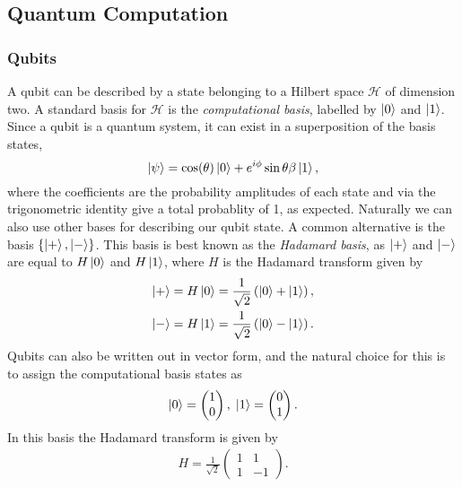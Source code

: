 \subsection{Quantum Computation}
\subsubsection{Qubits}
\label{subsubsection:qubits}
A qubit can be described by a state belonging to a Hilbert space $\mathcal{H}$ of dimension two.
A standard basis for $\mathcal{H}$ is the \emph{computational basis}, labelled by $\ket{0}$ and $\ket{1}$.
Since a qubit is a quantum system, it can exist in a superposition of the basis states,
\begin{equation}
    \label{eqn:arb_qubit}
    \ket{\psi} = \cos(\theta)\ket{0} + e^{i\phi}\sin{\theta}\beta\ket{1},
\end{equation}
where the coefficients are the probability amplitudes of each state and via the trigonometric identity give a total probablity of 1, as expected.
Naturally we can also use other bases for describing our qubit state. A common alternative is the basis $\{\ket{+}, \ket{-}\}$.
This basis is best known as the \emph{Hadamard basis}, as $\ket{+}$ and $\ket{-}$ are equal to $H\ket{0}$ and $H\ket{1}$, where $H$ is the Hadamard transform given by
\begin{align}
    \ket{+} &= H\ket{0} = \frac{1}{\sqrt2} \left(\ket{0} + \ket{1}\right),\\
    \ket{-} &= H\ket{1} = \frac{1}{\sqrt2} \left(\ket{0} - \ket{1}\right).
\end{align}
Qubits can also be written out in vector form, and the natural choice for this is to assign the computational basis states as
\begin{align}
    \ket{0} = 
    \begin{pmatrix}
        1 \\
        0
    \end{pmatrix}, \;
    \ket{1} = 
    \begin{pmatrix}
        0 \\
        1
    \end{pmatrix}.
\end{align}
In this basis the Hadamard transform is given by
\begin{align}
    H = \frac{1}{\sqrt{2}}
    \begin{pmatrix}
        1 & 1\\
        1 & -1
    \end{pmatrix}.
    \label{eqn:hadmard_matrix}
\end{align}

